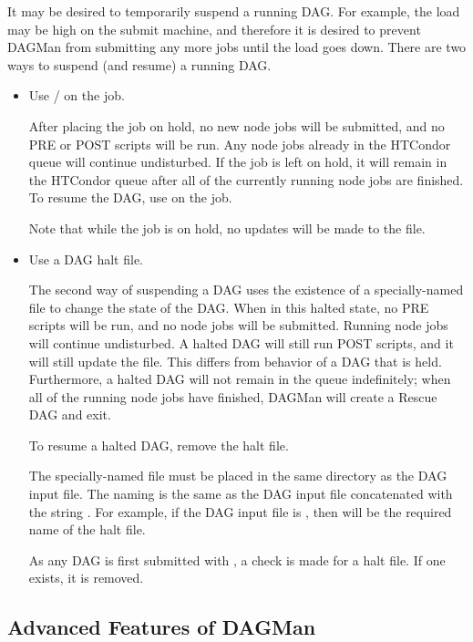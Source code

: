 It may be desired to temporarily suspend a running DAG.
For example, the load may be high on the submit machine,
and therefore it is desired to prevent DAGMan from
submitting any more jobs until the load goes down.
There are two ways to suspend (and resume) a running DAG.

\begin{itemize}
\item Use / on the  job.

After placing the  job on hold,
no new node jobs will be submitted,
and no PRE or POST scripts will be run.
Any node jobs already in the HTCondor queue will continue undisturbed.
If the  job is left on hold,
it will remain in the HTCondor queue after all of the currently running
node jobs are finished.
To resume the DAG, use  on the  job.

Note that while the  job is on hold,
no updates will be made to the  file.

\item Use a DAG halt file.

The second way of suspending a DAG uses the existence of a specially-named
file to change the state of the DAG.
When in this halted state,
no PRE scripts will be run, and no node jobs will be submitted.  
Running node jobs will continue undisturbed.
A halted DAG will still run POST scripts,
and it will still update the  file.
This differs from behavior of a DAG that is held.
Furthermore, a halted DAG will not remain in the queue indefinitely;
when all of the running node jobs have finished, 
DAGMan will create a Rescue DAG and exit.

To resume a halted DAG, remove the halt file.

The specially-named file must be placed in the same directory
as the DAG input file.
The naming is the same as the DAG input file concatenated with the
string .
For example, if the DAG input file is , 
then  will be the required name of the halt file.

As any DAG is first submitted with , 
a check is made for a halt file.
If one exists, it is removed.
\end{itemize}

\subsection{\label{sec:AdvDAGMan}Advanced Features of DAGMan}


